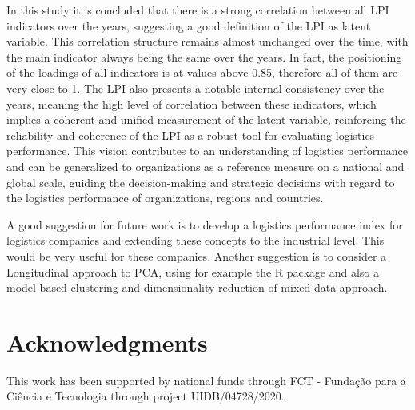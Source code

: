 \documentclass[a4paper,11pt,twoside]{article}
\begin{document}
In this study it is concluded that there is a strong correlation between all LPI indicators over the years, suggesting a good definition of the LPI as latent variable. This correlation structure remains almost unchanged over the time, with the main indicator always being the same over the years. In fact, the positioning of the loadings of all indicators is at values above 0.85, therefore all of them are very close to 1.
%
The LPI also presents a notable internal consistency over the years, meaning the high level of correlation between these indicators, which  implies a coherent and unified measurement of the latent variable, reinforcing the reliability and coherence of the LPI as a robust tool for evaluating logistics performance.
%
This vision contributes to an understanding of logistics performance and can be generalized to organizations as a reference measure on a national and global scale, guiding the decision-making and strategic decisions with regard to the logistics performance of organizations, regions and countries.

A good suggestion for future work is to develop a logistics performance index for logistics companies and extending these concepts to the industrial level. This would be very useful for these companies. 
%
Another suggestion is to consider a Longitudinal approach to PCA, using for example the R package \cite{jarmund2022alasca} and also a model based clustering and dimensionality reduction of mixed data \cite{ranalli2017model} approach.


\section*{Acknowledgments}
This work has been supported by national funds through FCT - Fundação para a Ciência e Tecnologia through project UIDB/04728/2020.




\end{document}
